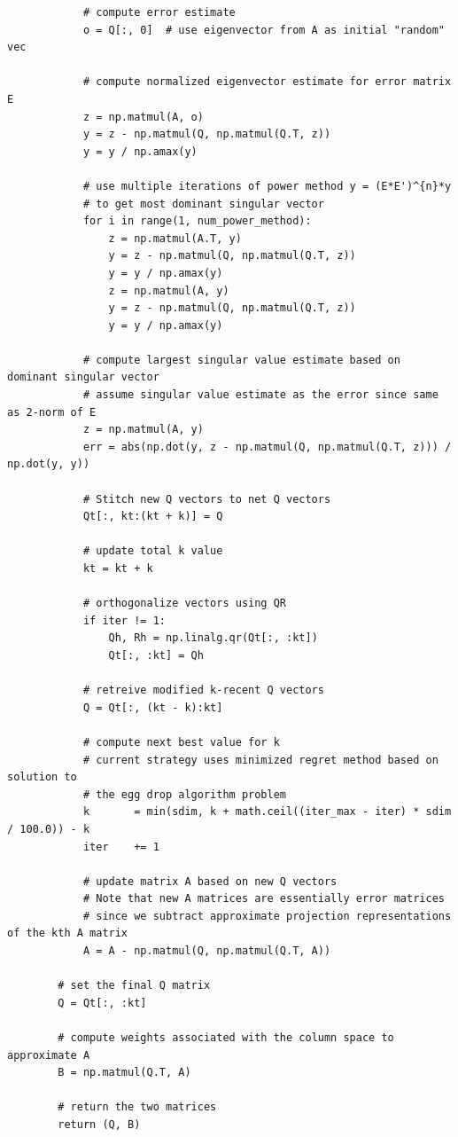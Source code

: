 \documentclass{article}[12pt]
\begin{document}
\begin{verbatim}
            # compute error estimate
            o = Q[:, 0]  # use eigenvector from A as initial "random" vec

            # compute normalized eigenvector estimate for error matrix E
            z = np.matmul(A, o)
            y = z - np.matmul(Q, np.matmul(Q.T, z))
            y = y / np.amax(y)

            # use multiple iterations of power method y = (E*E')^{n}*y
            # to get most dominant singular vector
            for i in range(1, num_power_method):
                z = np.matmul(A.T, y)
                y = z - np.matmul(Q, np.matmul(Q.T, z))
                y = y / np.amax(y)
                z = np.matmul(A, y)
                y = z - np.matmul(Q, np.matmul(Q.T, z))
                y = y / np.amax(y)

            # compute largest singular value estimate based on dominant singular vector
            # assume singular value estimate as the error since same as 2-norm of E
            z = np.matmul(A, y)
            err = abs(np.dot(y, z - np.matmul(Q, np.matmul(Q.T, z))) / np.dot(y, y))

            # Stitch new Q vectors to net Q vectors
            Qt[:, kt:(kt + k)] = Q

            # update total k value
            kt = kt + k

            # orthogonalize vectors using QR
            if iter != 1:
                Qh, Rh = np.linalg.qr(Qt[:, :kt])
                Qt[:, :kt] = Qh

            # retreive modified k-recent Q vectors
            Q = Qt[:, (kt - k):kt]

            # compute next best value for k
            # current strategy uses minimized regret method based on solution to
            # the egg drop algorithm problem
            k       = min(sdim, k + math.ceil((iter_max - iter) * sdim / 100.0)) - k
            iter    += 1

            # update matrix A based on new Q vectors
            # Note that new A matrices are essentially error matrices
            # since we subtract approximate projection representations of the kth A matrix
            A = A - np.matmul(Q, np.matmul(Q.T, A))

        # set the final Q matrix
        Q = Qt[:, :kt]

        # compute weights associated with the column space to approximate A
        B = np.matmul(Q.T, A)

        # return the two matrices
        return (Q, B)
\end{verbatim}
   
\end{document}
